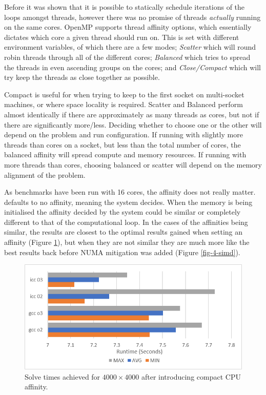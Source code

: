 \documentclass[11pt,twocolumn,a4paper]{article}
\begin{document}
Before it was shown that it is possible to statically schedule iterations of the loops amongst threads, however there was no promise of threads \textit{actually} running on the same cores. OpenMP supports thread affinity options, which essentially dictates which core a given thread should run on. This is set with different environment variables, of which there are a few modes; \textit{Scatter} which will round robin threads through all of the different cores; \textit{Balanced} which tries to spread the threads in even ascending groups on the cores; and \textit{Close/Compact} which will try keep the threads as close together as possible. \par

Compact is useful for when trying to keep to the first socket on multi-socket machines, or where space locality is required. Scatter and Balanced perform almost identically if there are approximately as many threads as cores, but not if there are significantly more/less. Deciding whether to choose one or the other will depend on the problem and run configuration. If running with slightly more threads than cores on a socket, but less than the total number of cores, the balanced affinity will spread compute and memory resources. If running with more threads than cores, choosing balanced or scatter will depend on the memory alignment of the problem. \par

As benchmarks have been run with 16 cores, the affinity does not really matter.  defaults to no affinity, meaning the system decides. When the memory is being initialised the affinity decided by the system could be similar or completely different to that of the computational loop. In the cases of the affinities being similar, the results are closest to the optimal results gained when setting an affinity (Figure \ref{fig-6-affin}), but when they are not similar they are much more like the best results back  before NUMA mitigation was added (Figure \ref{fig-4-simd}). \par

\begin{figure}[h]
        \centering
        \includegraphics[width=0.8\linewidth]{figures/7-CPU-AFFIN.png}
        \caption{Solve times achieved for $4000\times4000$ after introducing compact CPU affinity.}
        \label{fig-6-affin}
\end{figure}
\end{document}
